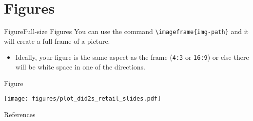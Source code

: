 \documentclass[aspectratio=169,t,11pt,table]{beamer}
\begin{document}
\section{Figures}


\begin{frame}{Figure}{Full-size Figures}
  You can use the command \texttt{\textbackslash imageframe\{img-path\}} and it will create a full-frame of a picture. 
  
  \begin{itemize}
  \item Ideally, your figure is the same aspect as the frame (\texttt{4:3} or \texttt{16:9}) or else there will be white space in one of the directions.
  \end{itemize}
\end{frame}

\begin{frame}{Figure}
  \begin{adjustbox}{width = 0.75\textwidth, center}
    \texttt{[image: figures/plot\_did2s\_retail\_slides.pdf]}
  \end{adjustbox}
\end{frame}


\begin{frame}{References}
  \thispagestyle{empty}
  \printbibliography
\end{frame}
\appendix
\end{document}
